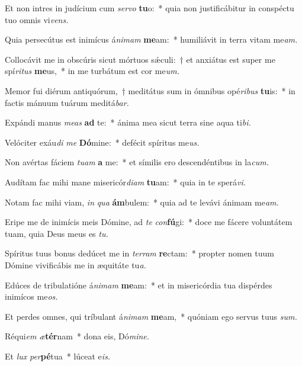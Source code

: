 \item Et non intres in judícium cum \textit{servo} \textbf{tu}o:~* quia non justificábitur in conspéctu tuo o\-mnis vi\textit{vens.}
\item Quia persecútus est inimícus á\tinyhspace\textit{nimam} \textbf{me}am:~* humiliávit in terra vitam me\textit{am.}
\item Collocávit me in obscúris sicut mórtuos sǽculi:~† et anxiátus est super me spí\textit{ritus} \textbf{me}us,~* in me turbátum est cor me\textit{um.}
\item Memor fui diérum antiquórum,~† meditátus sum in ómnibus opé\tinyhspace\textit{ribus} \textbf{tu}is:~* in factis mánuum tuárum meditá\textit{bar.}
\item Expándi manus \textit{meas} \textbf{ad} te:~* ánima mea sicut terra sine aqua ti\textit{bi.}
\item Velóciter exáu\tinyhspace\textit{di} \textit{me} \textbf{Dó}mine:~* defécit spíritus me\textit{us.}
\item Non avértas fáciem \textit{tuam} \textbf{a} me:~* et símilis ero descendéntibus in la\textit{cum.}
\item Audítam fac mihi mane misericór\textit{diam} \textbf{tu}am:~* quia in te sperá\tinyhspace\textit{vi.}
\item Notam fac mihi viam, \textit{in} \textit{qua} \textbf{ám}bulem:~* quia ad te levávi ánimam me\tinyhspace\textit{am.}
\item Eripe me de inimícis meis Dómine, ad \textit{te} \textit{con}\textbf{fú}gi:~* doce me fácere voluntátem tuam, quia Deus meus es \textit{tu.}
\item Spíritus tuus bonus dedúcet me in \textit{terram} \textbf{re}ctam:~* propter nomen tuum Dómine vivificábis me in æquitáte tu\tinyhspace\textit{a.}
\item Edúces de tribulatióne á\tinyhspace\textit{nimam} \textbf{me}am:~* et in misericórdia tua dispérdes inimícos me\textit{os.}
\item Et perdes omnes, qui tríbulant á\textit{nimam} \textbf{me}am,~* quóniam ego servus tuus \textit{sum.}
\item Réqui\tinyhspace\textit{em} \textit{æ}\textbf{tér}nam~* dona eis, Dó\textit{mine.}
\item Et \textit{lux} \textit{per}\textbf{pé}tua~* lúceat e\tinyhspace\textit{is.}